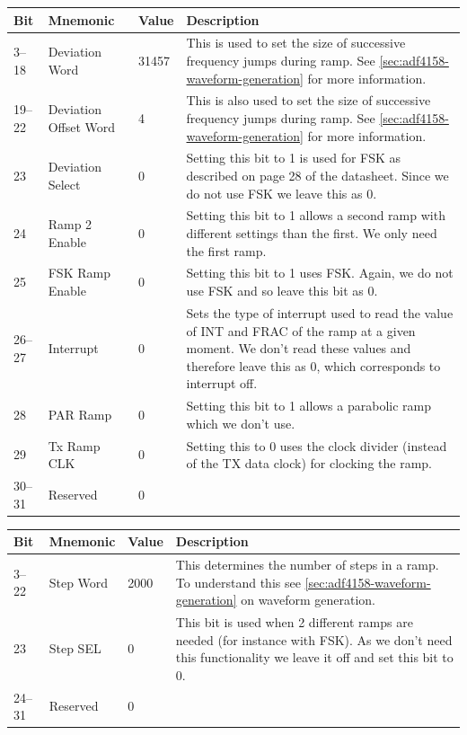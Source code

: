 \label{tab:adf4158-reg-map-5}
\begin{tabularx}{\textwidth}{l l l X}
        \caption{DEVIATION REGISTER (R5) MAP} \\
        \toprule
        Bit & Mnemonic & Value & Description \\
        \midrule

        3--18 & Deviation Word & 31457 & This is used to set the size of successive frequency jumps during
        ramp. See \cref{sec:adf4158-waveform-generation} for more
        information. \\
        19--22 & Deviation Offset Word & 4 & This is also used to set the size of successive frequency
        jumps during ramp. See \cref{sec:adf4158-waveform-generation}
        for more information. \\
        23 & Deviation Select & 0 & Setting this bit to 1 is used for FSK as described on page 28 of the
        datasheet. Since we do not use FSK we leave this as 0. \\
        24 & Ramp 2 Enable & 0 & Setting this bit to 1 allows a second ramp with different settings than
        the first. We only need the first ramp. \\
        25 & FSK Ramp Enable & 0 & Setting this bit to 1 uses FSK. Again, we do not use FSK and so leave
        this bit as 0. \\
        26--27 & Interrupt & 0 & Sets the type of interrupt used to read the value of INT and FRAC of the
        ramp at a given moment. We don't read these values and therefore leave
        this as 0, which corresponds to interrupt off. \\
        28 & PAR Ramp & 0 & Setting this bit to 1 allows a parabolic ramp which we don't use. \\
        29 & Tx Ramp CLK & 0 & Setting this to 0 uses the clock divider (instead of the TX data clock) for
        clocking the ramp. \\
        30--31 & Reserved & 0 & \\

        \bottomrule
\end{tabularx}


\label{tab:adf4158-reg-map-6}
\begin{tabularx}{\textwidth}{l l l X}
        \caption{STEP REGISTER (R6) MAP} \\
        \toprule
        Bit & Mnemonic & Value & Description \\
        \midrule

        3--22 & Step Word & 2000 & This determines the number of steps in a ramp. To understand this see
        \cref{sec:adf4158-waveform-generation} on waveform generation. \\
        23 & Step SEL & 0 & This bit is used when 2 different ramps are needed (for instance with FSK). As
        we don't need this functionality we leave it off and set this bit to 0. \\
        24--31 & Reserved & 0 & \\

        \bottomrule
\end{tabularx}


